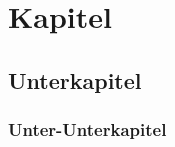 \section{Kapitel}
\label{sec:kapitel}

\lipsum[1]

\subsection{Unterkapitel}
\label{subsec:unterkapitel}

\lipsum[1]

\subsubsection{Unter-Unterkapitel}

\lipsum[1]

